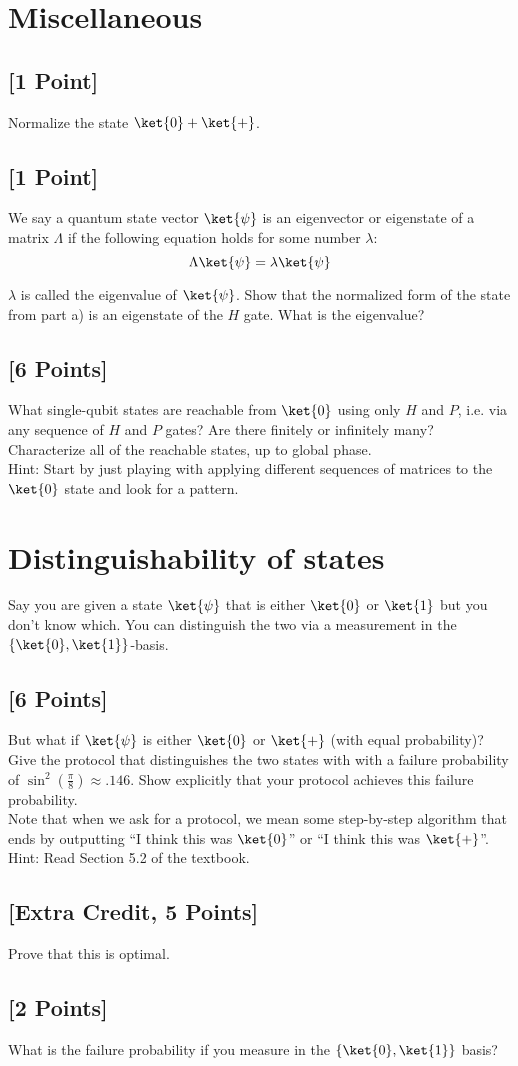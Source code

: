 \documentclass[11pt]{article}
\begin{document}
\section{Miscellaneous}

\subsection{[1 Point]} Normalize the state $\ket{0} + \ket{+}$.


\subsection{[1 Point]} We say a quantum state vector $\ket{\psi}$ is an eigenvector or eigenstate of a matrix $\Lambda$ if the following equation holds for some number $\lambda$:
\[
\Lambda \ket{\psi} = \lambda \ket{\psi}
\]

$\lambda$ is called the eigenvalue of $\ket{\psi}$. Show that the normalized form of the state from part a) is an eigenstate of the $H$ gate. What is the eigenvalue?


\subsection{[6 Points]} What single-qubit states are reachable from $\ket{0}$ using only $H$ and $P$, i.e. via any sequence of $H$ and $P$ gates? Are there finitely or infinitely many? Characterize all of the reachable states, up to global phase.
\\ Hint: Start by just playing with applying different sequences of matrices to the $\ket{0}$ state and look for a pattern.


\section{Distinguishability of states} Say you are given a state $\ket{\psi}$ that is either $\ket{0}$ or $\ket{1}$ but you don't know which. You can distinguish the two via a measurement in the $\{\ket{0}, \ket{1}\}$-basis.

\subsection{[6 Points]} But what if $\ket{\psi}$ is either $\ket{0}$ or $\ket{+}$ (with equal probability)? Give the protocol that distinguishes the two states with with a failure probability of $\sin^2(\frac{\pi}{8})\approx .146$. Show explicitly that your protocol achieves this failure probability.
\\ Note that when we ask for a protocol, we mean some step-by-step algorithm that ends by outputting ``I think this was $\ket{0}$'' or ``I think this was $\ket{+}$''.
\\ Hint: Read Section 5.2 of the textbook.


\subsection{[Extra Credit, 5 Points]} Prove that this is optimal.


\subsection{[2 Points]} What is the failure probability if you measure in the $\{\ket{0}, \ket{1}\}$ basis?
\end{document}
